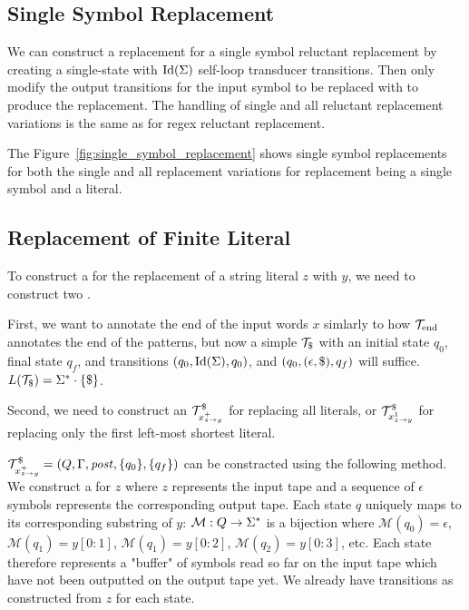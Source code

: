 \subsection{Single Symbol Replacement}

We can construct a replacement \dft for a single symbol reluctant replacement by creating a single-state \dft with $\text{Id}(\Sigma)$ self-loop transducer transitions.
Then only modify the output transitions for the input symbol to be replaced with to produce the replacement.
The handling of single and all reluctant replacement variations is the same as for regex reluctant replacement.

The Figure~\ref{fig:single_symbol_replacement} shows single symbol replacements for both the single and all replacement variations for replacement being a single symbol and a literal.

\subsection{Replacement of Finite Literal}

To construct a \nft for the replacement of a string literal $z$ with $y$, we need to construct two \nfts.

First, we want to annotate the end of the input words $x$ simlarly to how $\mathcal{T}_{\text{end}}$ annotates the end of the patterns, but now a simple \nft $\ft_\marker$ with an initial state $q_0$, final state $q_f$, and transitions $(q_0, \text{Id}(\Sigma), q_0)$, and $(q_0, (\epsilon, \$), q_f)$ will suffice.
$L(\mathcal{T}_\$) = \Sigma^* \cdot \{ \$ \}$.

Second, we need to construct an \nft $\mathcal{T}^\$_{x^{+}_{z \rightarrow y}}$ for replacing all literals, or $\mathcal{T}^\$_{x^{1}_{z \rightarrow y}}$ for replacing only the first left-most shortest literal.

$\mathcal{T}^\$_{x^{+}_{z \rightarrow y}} = (Q, \Gamma, \mathit{post}, \{ q_0 \}, \{ q_f \})$ can be constracted using the following method.
We construct a \nft for $z$ where $z$ represents the input tape and a sequence of $\epsilon$ symbols represents the corresponding output tape.
Each state $q$ uniquely maps to its corresponding substring of $y$: $\mathcal{M}: Q \rightarrow \Sigma^*$ is a bijection where $\mathcal{M}(q_0) = \epsilon$, $\mathcal{M}(q_1) = y[0:1]$, $\mathcal{M}(q_1) = y[0:2]$, $\mathcal{M}(q_2) = y[0:3]$, etc.
Each state therefore represents a "buffer" of symbols read so far on the input tape which have not been outputted on the output tape yet.
We already have transitions as constructed from $z$ for each state.

